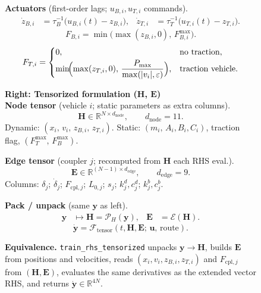 \documentclass[11pt]{article}
\begin{document}
\begin{figure}[t]
\begin{minipage}[t]{0.47\textwidth}
    \textbf{Actuators} (first-order lags; $u_{B,i},u_{T,i}$ commands).
    \begin{align*}
      \dot{z}_{B,i} &= \tau_B^{-1}\bigl(u_{B,i}(t) - z_{B,i}\bigr), &
      \dot{z}_{T,i} &= \tau_T^{-1}\bigl(u_{T,i}(t) - z_{T,i}\bigr).
    \end{align*}
    \begin{equation*}
      F_{B,i} = \min\bigl(\max(z_{B,i},0),\, F_{B,i}^{\max}\bigr).
    \end{equation*}
    \begin{equation*}
      F_{T,i} =
      \begin{cases}
        0, & \text{no traction}, \\[0.2em]
        \displaystyle
        \min\!\Bigl(\max(z_{T,i},0),\,\frac{P_{\max}}{\max(\lvert v_i\rvert,\varepsilon)}\Bigr),
        & \text{traction vehicle}.
      \end{cases}
    \end{equation*}
  \end{minipage}%
  \hfill
  \begin{minipage}[t]{0.47\textwidth}
    \textbf{Right: Tensorized formulation ($\bm{H}$, $\bm{E}$)}\\[0.25em]
    \textbf{Node tensor} (vehicle $i$; static parameters as extra columns).
    \begin{equation*}
      \bm{H} \in \mathbb{R}^{N \times d_{\mathrm{node}}},
      \qquad d_{\mathrm{node}} = 11.
    \end{equation*}
    Dynamic: $(x_i,\, v_i,\, z_{B,i},\, z_{T,i})$.
    Static: $(m_i,\, A_i,B_i,C_i)$, traction flag, $(F_T^{\max},\, F_B^{\max})$.

    \textbf{Edge tensor} (coupler $j$; recomputed from $\bm{H}$ each RHS eval.).
    \begin{equation*}
      \bm{E} \in \mathbb{R}^{(N-1) \times d_{\mathrm{edge}}},
      \qquad d_{\mathrm{edge}} = 9.
    \end{equation*}
    Columns: $\delta_j$; $\dot{\delta}_j$; $F_{\mathrm{cpl},j}$; $L_{0,j}$; $s_j$;
    $k^d_j,c^d_j$; $k^b_j,c^b_j$.

    \textbf{Pack / unpack} (same $\bm{y}$ as left).
    \begin{align*}
      \bm{y} &\mapsto \bm{H} = \mathcal{P}_H(\bm{y}), &
      \bm{E} &= \mathcal{E}(\bm{H}).
    \end{align*}
    \begin{equation*}
      \dot{\bm{y}} = \mathcal{F}_{\mathrm{tensor}}(t,\bm{H},\bm{E};\, \bm{u},\,\text{route}).
    \end{equation*}

    \textbf{Equivalence.}
    \texttt{train\_rhs\_tensorized} unpacks $\bm{y}\!\to\!\bm{H}$, builds $\bm{E}$ from
    positions and velocities, reads $(x_i,v_i,z_{B,i},z_{T,i})$ and $F_{\mathrm{cpl},j}$
    from $(\bm{H},\bm{E})$, evaluates the same derivatives as the extended vector RHS, and
    returns $\dot{\bm{y}}\in\mathbb{R}^{4N}$.
  \end{minipage}
\end{figure}
\end{document}
